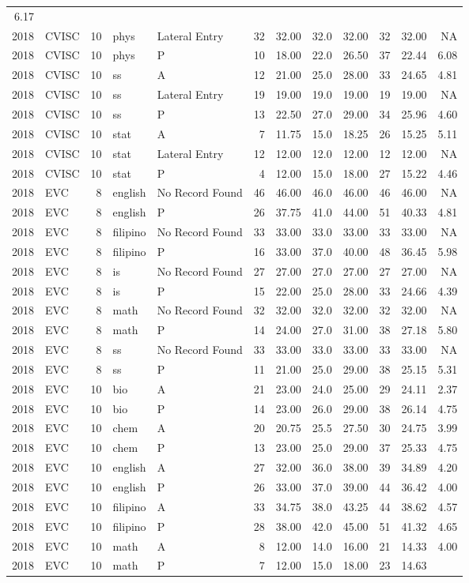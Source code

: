 \documentclass[]{article}
\begin{document}
\begin{longtable}[]{@{}rlrllrrrrrrr@{}}
6.17\tabularnewline
2018 & CVISC & 10 & phys & Lateral Entry & 32 & 32.00 & 32.0 & 32.00 &
32 & 32.00 & NA\tabularnewline
2018 & CVISC & 10 & phys & P & 10 & 18.00 & 22.0 & 26.50 & 37 & 22.44 &
6.08\tabularnewline
2018 & CVISC & 10 & ss & A & 12 & 21.00 & 25.0 & 28.00 & 33 & 24.65 &
4.81\tabularnewline
2018 & CVISC & 10 & ss & Lateral Entry & 19 & 19.00 & 19.0 & 19.00 & 19
& 19.00 & NA\tabularnewline
2018 & CVISC & 10 & ss & P & 13 & 22.50 & 27.0 & 29.00 & 34 & 25.96 &
4.60\tabularnewline
2018 & CVISC & 10 & stat & A & 7 & 11.75 & 15.0 & 18.25 & 26 & 15.25 &
5.11\tabularnewline
2018 & CVISC & 10 & stat & Lateral Entry & 12 & 12.00 & 12.0 & 12.00 &
12 & 12.00 & NA\tabularnewline
2018 & CVISC & 10 & stat & P & 4 & 12.00 & 15.0 & 18.00 & 27 & 15.22 &
4.46\tabularnewline
2018 & EVC & 8 & english & No Record Found & 46 & 46.00 & 46.0 & 46.00 &
46 & 46.00 & NA\tabularnewline
2018 & EVC & 8 & english & P & 26 & 37.75 & 41.0 & 44.00 & 51 & 40.33 &
4.81\tabularnewline
2018 & EVC & 8 & filipino & No Record Found & 33 & 33.00 & 33.0 & 33.00
& 33 & 33.00 & NA\tabularnewline
2018 & EVC & 8 & filipino & P & 16 & 33.00 & 37.0 & 40.00 & 48 & 36.45 &
5.98\tabularnewline
2018 & EVC & 8 & is & No Record Found & 27 & 27.00 & 27.0 & 27.00 & 27 &
27.00 & NA\tabularnewline
2018 & EVC & 8 & is & P & 15 & 22.00 & 25.0 & 28.00 & 33 & 24.66 &
4.39\tabularnewline
2018 & EVC & 8 & math & No Record Found & 32 & 32.00 & 32.0 & 32.00 & 32
& 32.00 & NA\tabularnewline
2018 & EVC & 8 & math & P & 14 & 24.00 & 27.0 & 31.00 & 38 & 27.18 &
5.80\tabularnewline
2018 & EVC & 8 & ss & No Record Found & 33 & 33.00 & 33.0 & 33.00 & 33 &
33.00 & NA\tabularnewline
2018 & EVC & 8 & ss & P & 11 & 21.00 & 25.0 & 29.00 & 38 & 25.15 &
5.31\tabularnewline
2018 & EVC & 10 & bio & A & 21 & 23.00 & 24.0 & 25.00 & 29 & 24.11 &
2.37\tabularnewline
2018 & EVC & 10 & bio & P & 14 & 23.00 & 26.0 & 29.00 & 38 & 26.14 &
4.75\tabularnewline
2018 & EVC & 10 & chem & A & 20 & 20.75 & 25.5 & 27.50 & 30 & 24.75 &
3.99\tabularnewline
2018 & EVC & 10 & chem & P & 13 & 23.00 & 25.0 & 29.00 & 37 & 25.33 &
4.75\tabularnewline
2018 & EVC & 10 & english & A & 27 & 32.00 & 36.0 & 38.00 & 39 & 34.89 &
4.20\tabularnewline
2018 & EVC & 10 & english & P & 26 & 33.00 & 37.0 & 39.00 & 44 & 36.42 &
4.00\tabularnewline
2018 & EVC & 10 & filipino & A & 33 & 34.75 & 38.0 & 43.25 & 44 & 38.62
& 4.57\tabularnewline
2018 & EVC & 10 & filipino & P & 28 & 38.00 & 42.0 & 45.00 & 51 & 41.32
& 4.65\tabularnewline
2018 & EVC & 10 & math & A & 8 & 12.00 & 14.0 & 16.00 & 21 & 14.33 &
4.00\tabularnewline
2018 & EVC & 10 & math & P & 7 & 12.00 & 15.0 & 18.00 & 23 & 14.63 &

\end{longtable}
\end{document}
